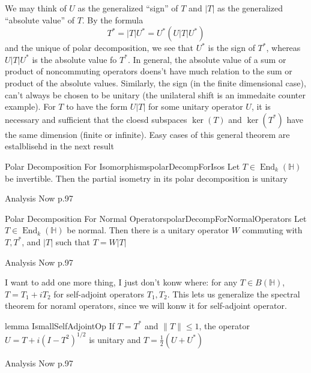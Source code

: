 \documentclass[oneside]{book}
\renewcommand{\H}{\mathbb{H}}
\newcommand{\End}{\operatorname{End}}
\begin{document}
We may think of $U$ as the generalized ``sign'' of $T$ and $|T|$ as the generalized ``absolute value'' of $T$. By the
formula
\[
	T^*= |T|U^* = U^*(U|T|U^*)
\]
and the unique of polar decomposition, we see that $U^*$ is the sign of $T^*$, whereas $U|T|U^*$ is the absolute value
fo $T^*$. In general, the absolute value of a sum or product of noncommuting operators doens't have much relation to
the sum or product of the absolute values. Similarly, the sign (in the finite dimensional case), can't always be
chosen to be unitary (the unilateral shift is an immedaite counter example). For $T$ to have the form $U|T|$ for
some unitary operator $U$, it is necessary and sufficient that the cloesd subspaces $\ker(T)$ and $\ker(T^*)$ have the
same dimension (finite or infinite). Easy cases of this general theorem are estalblisehd in the next result

\begin{prop}{Polar Decomposition For Isomorphisms}{polarDecompForIsos}
	Let $T \in \End_k(\H)$ be invertible. Then the partial isometry in its polar decomposition is unitary
\end{prop}

\begin{Proof}
	Analysis Now p.97
\end{Proof}

\begin{prop}{Polar Decomposition For Normal Operators}{polarDecompForNormalOperators}
	Let $T \in\End_k(\H)$ be normal. Then there is a unitary operator $W$ commuting with $T, T^*$, and $|T|$ such
	that $T = W|T|$
\end{prop}

\begin{Proof}
	Analysis Now p.97
\end{Proof}

I want to add one more thing, I just don't konw where: for any $T \in B(\H)$, $T = T_1 + iT_2$ for self-adjoint
operators $T_1, T_2$. This lets us generalize the spectral theorem for noraml operators, since we will konw it for
self-adjoint operator.

\begin{lem}{lemma I}{smallSelfAdjointOp}
	If $T = T^*$ and $\|T\| \le 1$, the operator $U = T + i(I-T^2)^{1/2}$ is unitary and $T = \frac{1}{2}(U
	+ U^*)$
\end{lem}

\begin{Proof}
	Analysis Now p.97
\end{Proof}
\end{document}
